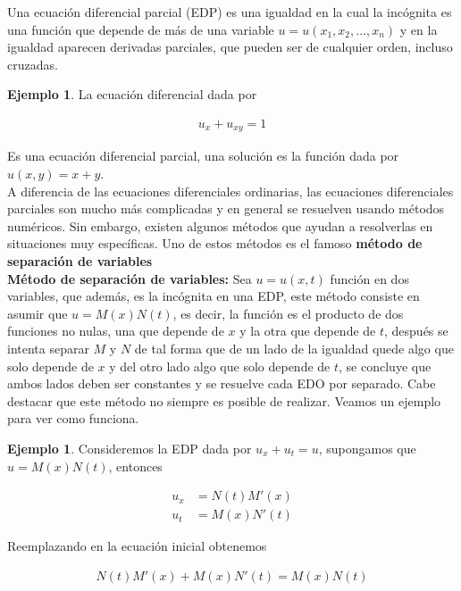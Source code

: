 \documentclass{article}
\theoremstyle{plain}
\theoremstyle{definition}
\newtheorem{ejem}[thm]{Ejemplo}
\begin{document}
Una ecuación diferencial parcial (EDP) es una igualdad en la cual la incógnita es una función que depende de más de una variable $u=u(x_1,x_2,...,x_n)$ y en la igualdad aparecen derivadas parciales, que pueden ser de cualquier orden, incluso cruzadas. \\

\begin{ejem}La ecuación diferencial dada por
\end{ejem}

\begin{align*}
    u_x+u_{xy} = 1
\end{align*}

Es una ecuación diferencial parcial, una solución es la función dada por $u(x,y) = x+y$. \\

A diferencia de las ecuaciones diferenciales ordinarias, las ecuaciones diferenciales parciales son mucho más complicadas y en general se resuelven usando métodos numéricos. Sin embargo, existen algunos métodos que ayudan a resolverlas en situaciones muy específicas. Uno de estos métodos es el famoso \textbf{método de separación de variables} \\

\textbf{Método de separación de variables:} Sea $u=u(x,t)$ función en dos variables, que además, es la incógnita en una EDP, este método consiste en asumir que $u = M(x)N(t)$, es decir, la función es el producto de dos funciones no nulas, una que depende de $x$ y la otra que depende de $t$, después se intenta separar $M$ y $N$ de tal forma que de un lado de la igualdad quede algo que solo depende de $x$ y del otro lado algo que solo depende de $t$, se concluye que ambos lados deben ser constantes y se resuelve cada EDO por separado. Cabe destacar que este método no siempre es posible de realizar. Veamos un ejemplo para ver como funciona. \\


\begin{ejem}Consideremos la EDP dada por $u_x+u_t = u$, supongamos que $u= M(x)N(t)$, entonces
\end{ejem}

\begin{align*}
    u_x &= N(t)M'(x) \\
    u_t &= M(x)N'(t)
\end{align*}

Reemplazando en la ecuación inicial obtenemos

\begin{align*}
    N(t)M'(x)+M(x)N'(t) =  M(x)N(t)
\end{align*}
\end{document}
